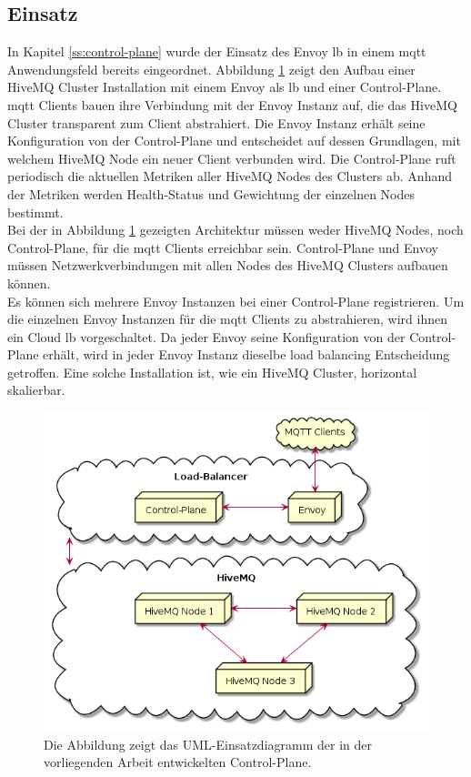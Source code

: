 \subsection{Einsatz}
In Kapitel \ref{ss:control-plane} wurde der Einsatz des Envoy \acl{lb} in einem \ac{mqtt} Anwendungsfeld bereits eingeordnet. Abbildung \ref{fig:deployment-diagram} zeigt den Aufbau einer HiveMQ Cluster Installation mit einem Envoy als \acl{lb} und einer Control-Plane.
\\
\ac{mqtt} Clients bauen ihre Verbindung mit der Envoy Instanz auf, die das HiveMQ Cluster transparent zum Client abstrahiert. Die Envoy Instanz erhält seine Konfiguration von der Control-Plane und entscheidet auf dessen Grundlagen, mit welchem HiveMQ Node ein neuer Client verbunden wird. Die Control-Plane ruft periodisch die aktuellen Metriken aller HiveMQ Nodes des Clusters ab. Anhand der Metriken werden Health-Status und Gewichtung der einzelnen Nodes bestimmt.
\\
Bei der in Abbildung \ref{fig:deployment-diagram} gezeigten Architektur müssen weder HiveMQ Nodes, noch Control-Plane, für die \ac{mqtt} Clients erreichbar sein. Control-Plane und Envoy müssen Netzwerkverbindungen mit allen Nodes des HiveMQ Clusters aufbauen können.
\\
Es können sich mehrere Envoy Instanzen bei einer Control-Plane registrieren.
Um die einzelnen Envoy Instanzen für die \ac{mqtt} Clients zu abstrahieren, wird ihnen ein Cloud \acl{lb} vorgeschaltet.
Da jeder Envoy seine Konfiguration von der Control-Plane erhält, wird in jeder Envoy Instanz dieselbe load balancing Entscheidung getroffen.
Eine solche Installation ist, wie ein HiveMQ Cluster, horizontal skalierbar.
\begin{figure}[h]
    \centering
    \includegraphics[scale=0.6]{gen/deployment.png}
    \caption{Die Abbildung zeigt das UML-Einsatzdiagramm der in der vorliegenden Arbeit entwickelten Control-Plane.}
    \label{fig:deployment-diagram}
\end{figure}
\newpage
